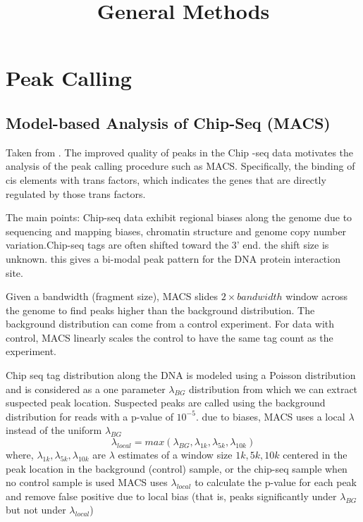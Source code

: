 \documentclass{paper}
\begin{document}
\title{General Methods}
\maketitle

\section{Peak Calling}
\subsection{Model-based Analysis of Chip-Seq (MACS)}
Taken from \cite{zhang2008model}. The improved quality of peaks in the Chip -seq data motivates the analysis of the peak calling procedure such as MACS. Specifically, the binding of cis elements with trans factors, which indicates the genes that are directly regulated by those trans factors. 

The main points: Chip-seq data exhibit regional biases along the genome due to sequencing and mapping biases, chromatin structure and genome copy number variation.Chip-seq tags are often shifted toward the 3' end. the shift size is unknown. this gives a bi-modal peak pattern for the DNA protein interaction site. 

Given a bandwidth (fragment size), MACS  slides $2\times bandwidth$ window across the genome to find peaks higher than the background distribution. The background distribution can come from a control experiment. For data with control, MACS linearly scales the control to have the same tag count as the experiment. 
 
Chip seq tag distribution along the DNA is modeled using a Poisson distribution and is considered as a one parameter $\lambda_{BG}$ distribution from which we can extract suspected peak location. 
Suspected peaks are called using the background distribution for reads with a p-value of $10^{-5}$. due to biases, MACS uses a local $\lambda$ instead of the uniform $\lambda_{BG}$
\begin{equation*}
\lambda_{local}=max(\lambda_{BG},\lambda_{1k},\lambda_{5k},\lambda_{10k})
\end{equation*}
where, $\lambda_{1k},\lambda_{5k},\lambda_{10k}$ are $\lambda$ estimates of a window size $1k,5k,10k$ centered in the peak location in the background (control) sample, or the chip-seq sample when no control sample is used MACS uses $\lambda_{local}$ to calculate the p-value for each peak and remove false positive due to local bias (that is, peaks significantly under $\lambda_{BG}$ but not under $\lambda_{local}$)




\end{document}

